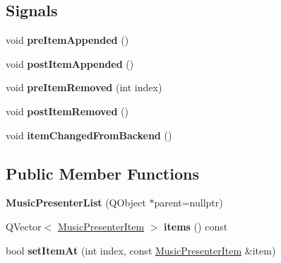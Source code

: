\subsection*{Signals}
\begin{DoxyCompactItemize}
\item 
\mbox{\label{class_music_presenter_list_af9065d7835d29c1e95417d1e198f8685}} 
void {\bfseries pre\+Item\+Appended} ()
\item 
\mbox{\label{class_music_presenter_list_a83d746e859bcbe59dec8634b4fc28a62}} 
void {\bfseries post\+Item\+Appended} ()
\item 
\mbox{\label{class_music_presenter_list_a8f21f5a1a00c485d015390163bb62243}} 
void {\bfseries pre\+Item\+Removed} (int index)
\item 
\mbox{\label{class_music_presenter_list_aa08884da47905436ecf3cd210863474f}} 
void {\bfseries post\+Item\+Removed} ()
\item 
\mbox{\label{class_music_presenter_list_a0aa7b8f00f42f011f1236e894c46cd08}} 
void {\bfseries item\+Changed\+From\+Backend} ()
\end{DoxyCompactItemize}
\subsection*{Public Member Functions}
\begin{DoxyCompactItemize}
\item 
\mbox{\label{class_music_presenter_list_a2a4622f9e4f4bfdb8c194ee4658de01f}} 
{\bfseries Music\+Presenter\+List} (Q\+Object $\ast$parent=nullptr)
\item 
\mbox{\label{class_music_presenter_list_a683d665dcb75b525ad75ecae2db56bcb}} 
Q\+Vector$<$ \mbox{\hyperlink{struct_music_presenter_item}{Music\+Presenter\+Item}} $>$ {\bfseries items} () const
\item 
\mbox{\label{class_music_presenter_list_ac6de919442f269bfd2ce6418950ed5c7}} 
bool {\bfseries set\+Item\+At} (int index, const \mbox{\hyperlink{struct_music_presenter_item}{Music\+Presenter\+Item}} \&item)
\end{DoxyCompactItemize}
